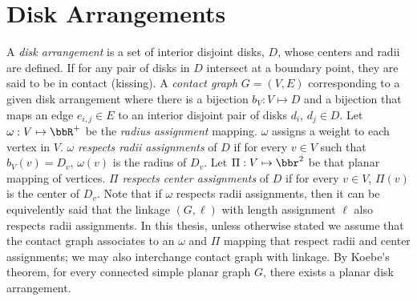 \section{Disk Arrangements}
 A \textit{disk arrangement} is a set of interior disjoint disks, $D$, whose centers and radii are defined.  If for any pair of disks in $D$ intersect at a boundary point, they are said to be in contact (kissing).
A \textit{contact graph} $G=(V,E)$ corresponding to a given disk arrangement where there is a bijection $b_V: V \mapsto D$ and a bijection that maps an edge $e_{i,j} \in E$ to an interior disjoint pair of disks $d_i$, $d_j \in D$.
Let $\omega: V \mapsto \bbR^+$ be the \textit{radius assignment} mapping.  $\omega$ assigns a weight to each vertex in $V$.  
$\omega$ \textit{respects radii assignments} of $D$ if for every $v \in V$ such that $b_V(v) = D_v$, $\omega(v)$ is the radius of $D_v$.  
Let $\Pi:V \mapsto \bbr^2$ be that planar mapping of vertices.  $\Pi$ \textit{respects center assignments} of $D$ if for every $v \in V$, $\Pi(v)$ is the center of $D_v$.  
Note that if $\omega$ respects radii assignments, then it can be equivelently said that the linkage $(G,\ell)$ with length assignment $\ell$ also respects radii assignments.  
In this thesis, unless otherwise stated we assume that the contact graph associates to an $\omega$ and $\Pi$ mapping that respect radii and center assignments; we may also interchange contact graph with linkage.
By Koebe's theorem, for every connected simple planar graph $G$, there exists a planar disk arrangement. 



